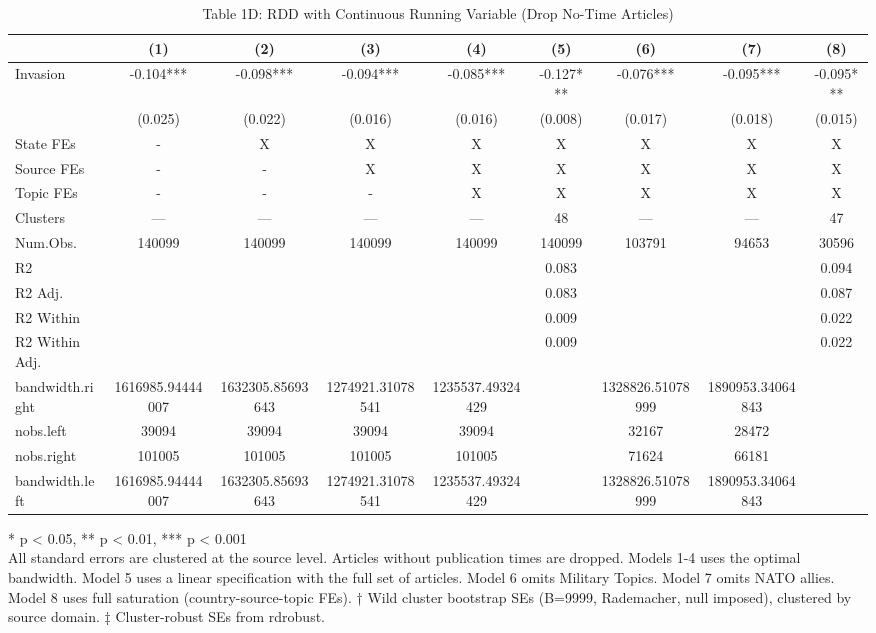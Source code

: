 \begin{table}[!t]
\caption{Table 1D: RDD with Continuous Running Variable (Drop No-Time Articles)} 
\fontsize{12.0pt}{14.4pt}\selectfont
\begin{tabular*}{\linewidth}{@{\extracolsep{\fill}}lcccccccc}
\toprule
  & (1) & (2) & (3) & (4) & (5) & (6) & (7) & (8) \\ 
\midrule\addlinespace[2.5pt]
Invasion & -0.104*** & -0.098*** & -0.094*** & -0.085*** & -0.127*** & -0.076*** & -0.095*** & -0.095*** \\ 
{} & {(0.025)} & {(0.022)} & {(0.016)} & {(0.016)} & {(0.008)} & {(0.017)} & {(0.018)} & {(0.015)} \\ 
State FEs & - & X & X & X & X & X & X & X \\ 
Source FEs & - & - & X & X & X & X & X & X \\ 
Topic FEs & - & - & - & X & X & X & X & X \\ 
Clusters & — & — & — & — & 48 & — & — & 47 \\ 
Num.Obs. & 140099 & 140099 & 140099 & 140099 & 140099 & 103791 & 94653 & 30596 \\ 
R2 &  &  &  &  & 0.083 &  &  & 0.094 \\ 
R2 Adj. &  &  &  &  & 0.083 &  &  & 0.087 \\ 
R2 Within &  &  &  &  & 0.009 &  &  & 0.022 \\ 
R2 Within Adj. &  &  &  &  & 0.009 &  &  & 0.022 \\ 
bandwidth.right & 1616985.94444007 & 1632305.85693643 & 1274921.31078541 & 1235537.49324429 &  & 1328826.51078999 & 1890953.34064843 &  \\ 
nobs.left & 39094 & 39094 & 39094 & 39094 &  & 32167 & 28472 &  \\ 
nobs.right & 101005 & 101005 & 101005 & 101005 &  & 71624 & 66181 &  \\ 
bandwidth.left & 1616985.94444007 & 1632305.85693643 & 1274921.31078541 & 1235537.49324429 &  & 1328826.51078999 & 1890953.34064843 &  \\ 
\bottomrule
\end{tabular*}
\begin{minipage}{\linewidth}
* p < 0.05, ** p < 0.01, *** p < 0.001\\
All standard errors are clustered at the source level. Articles without
publication times are dropped. Models 1-4 uses the optimal bandwidth. Model
5 uses a linear specification with the full set of articles. Model 6 omits
Military Topics. Model 7 omits NATO allies. Model 8 uses full saturation
(country-source-topic FEs). † Wild cluster bootstrap SEs (B=9999, Rademacher,
null imposed), clustered by source domain. ‡ Cluster-robust SEs from rdrobust.\\
\end{minipage}
\end{table}

